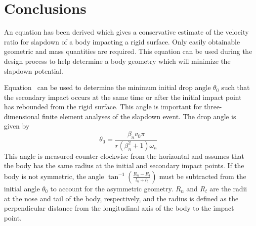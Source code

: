 \section{Conclusions}

An equation has been derived which gives a conservative estimate of
the velocity ratio for slapdown of a body impacting a rigid surface.
Only easily obtainable geometric and mass quantities are required.
This equation can be used during the design process to help determine
a body geometry which will minimize the slapdown potential.


Equation~ can be used to determine the minimum initial drop
angle $\theta_0$ such that the secondary impact occurs at the same
time or after the initial impact point has rebounded from the rigid
surface. This angle is important for three-dimensional finite element
analyses of the slapdown event.  The drop angle is given by
\begin{equation}
\theta_0 = \frac{\beta_n v_0\pi}{r(\beta_n^2+1)\omega_n}
\end{equation}
This angle is measured counter-clockwise from the horizontal and
assumes that the body has the same radius at the initial and secondary
impact points.  If the body is not symmetric, the angle
$\tan^{-1}\left(\frac{R_n-R_t}{l_n+l_t}\right)$ must be subtracted
from the initial angle $\theta_0$ to account for the asymmetric
geometry. $R_n$ and $R_t$ are the radii at the nose and tail of the
body, respectively, and the radius is defined as the perpendicular
distance from the longitudinal axis of the body to the impact point.
